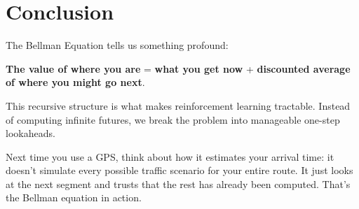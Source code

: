 \documentclass[journal, onecolumn]{IEEEtran}
\begin{document}
\section{Conclusion}

The Bellman Equation tells us something profound:

\begin{tcolorbox}[memorybox={The One Sentence Summary}]
\textbf{The value of where you are} = \textbf{what you get now} + \textbf{discounted average of where you might go next}.
\end{tcolorbox}

This recursive structure is what makes reinforcement learning tractable. Instead of computing infinite futures, we break the problem into manageable one-step lookaheads.

Next time you use a GPS, think about how it estimates your arrival time: it doesn't simulate every possible traffic scenario for your entire route. It just looks at the next segment and trusts that the rest has already been computed. That's the Bellman equation in action.
\end{document}
